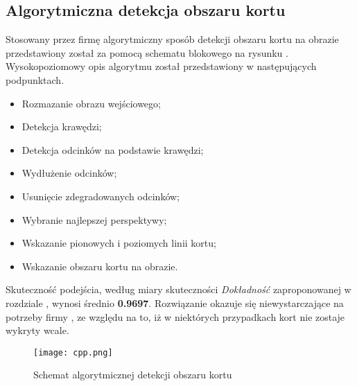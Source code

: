 \subsection{Algorytmiczna detekcja obszaru kortu}
\label{sec:aglorytmiczna_detekcja}

Stosowany przez firmę \blue{} algorytmiczny sposób detekcji obszaru kortu na obrazie przedstawiony został za pomocą schematu blokowego na rysunku . Wysokopoziomowy opis algorytmu został przedstawiony w następujących podpunktach.

\begin{itemize}
  \item Rozmazanie obrazu wejściowego;
  \item Detekcja krawędzi;
  \item Detekcja odcinków na podstawie krawędzi;
  \item Wydłużenie odcinków;
  \item Usunięcie zdegradowanych odcinków;
  \item Wybranie najlepszej perspektywy;
  \item Wskazanie pionowych i poziomych linii kortu;
  \item Wskazanie obszaru kortu na obrazie.
\end{itemize}

Skuteczność podejścia, według miary skuteczności \textit{Dokładność} zaproponowanej w rozdziale , wynosi średnio \textbf{0.9697}.
Rozwiązanie okazuje się niewystarczające na potrzeby firmy \blue{}, ze względu na to, iż w niektórych przypadkach kort nie zostaje wykryty wcale.

\begin{figure}[h]
  \centering
  \caption{Schemat algorytmicznej detekcji obszaru kortu}
  \texttt{[image: cpp.png]}
  \label{fig:algcpp}
\end{figure}

